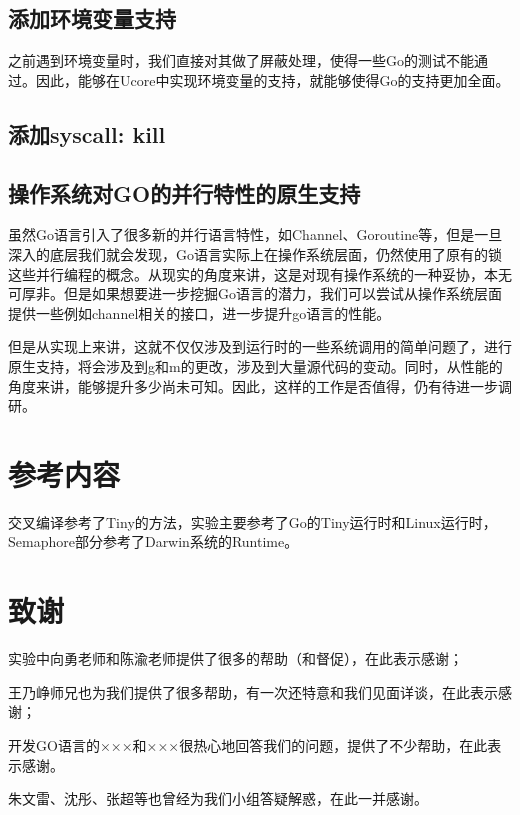 \documentclass{article}
\begin{document}
\subsection{添加环境变量支持}
之前遇到环境变量时，我们直接对其做了屏蔽处理，使得一些Go的测试不能通过。因此，能够在Ucore中实现环境变量的支持，就能够使得Go的支持更加全面。

\subsection{添加syscall: kill}

\subsection{操作系统对GO的并行特性的原生支持}
虽然Go语言引入了很多新的并行语言特性，如Channel、Goroutine等，但是一旦深入的底层我们就会发现，Go语言实际上在操作系统层面，仍然使用了原有的锁这些并行编程的概念。从现实的角度来讲，这是对现有操作系统的一种妥协，本无可厚非。但是如果想要进一步挖掘Go语言的潜力，我们可以尝试从操作系统层面提供一些例如channel相关的接口，进一步提升go语言的性能。

但是从实现上来讲，这就不仅仅涉及到运行时的一些系统调用的简单问题了，进行原生支持，将会涉及到g和m的更改，涉及到大量源代码的变动。同时，从性能的角度来讲，能够提升多少尚未可知。因此，这样的工作是否值得，仍有待进一步调研。

\section{参考内容}

交叉编译参考了Tiny的方法，实验主要参考了Go的Tiny运行时和Linux运行时，Semaphore部分参考了Darwin系统的Runtime。

\section{致谢}
实验中向勇老师和陈渝老师提供了很多的帮助（和督促），在此表示感谢；

王乃峥师兄也为我们提供了很多帮助，有一次还特意和我们见面详谈，在此表示感谢；

开发GO语言的×××和×××很热心地回答我们的问题，提供了不少帮助，在此表示感谢。

朱文雷、沈彤、张超等也曾经为我们小组答疑解惑，在此一并感谢。
\end{document}
